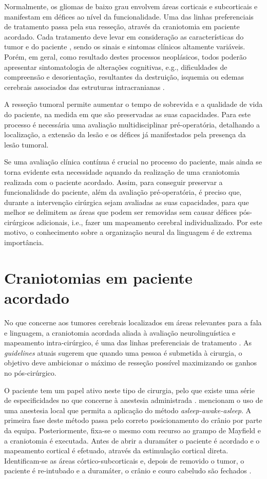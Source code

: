 \documentclass[output=paper,colorlinks,citecolor=brown,booklanguage=portuguese]{langscibook}
\begin{document}
Normalmente, os gliomas de baixo grau envolvem áreas corticais e subcorticais e manifestam em défices ao nível da funcionalidade. Uma das linhas preferenciais de tratamento passa pela sua resseção, através da craniotomia em paciente acordado. Cada tratamento deve levar em consideração as características do tumor e do paciente \citep{Bertani2009}, sendo os sinais e sintomas clínicos altamente variáveis. Porém, em geral, como resultado destes processos neoplásicos, todos poderão apresentar sintomatologia de alterações cognitivas, e.g., dificuldades de compreensão e desorientação, resultantes da destruição, isquemia ou edemas cerebrais associados das estruturas intracranianas \citep{Miotto2011}.

A resseção tumoral permite aumentar o tempo de sobrevida e a qualidade de vida do paciente, na medida em que são preservadas as suas capacidades. Para este processo é necessária uma avaliação multidisciplinar pré-operatória, detalhando a localização, a extensão da lesão e os défices já manifestados pela presença da lesão tumoral.

Se uma avaliação clínica contínua é crucial no processo do paciente, mais ainda se torna evidente esta necessidade aquando da realização de uma craniotomia realizada com o paciente acordado. Assim, para conseguir preservar a funcionalidade do paciente, além da avaliação pré-operatória, é preciso que, durante a intervenção cirúrgica sejam avaliadas as suas capacidades, para que melhor se delimitem as áreas que podem ser removidas sem causar défices pós-cirúrgicos adicionais, i.e., fazer um mapeamento cerebral individualizado. Por este motivo, o conhecimento sobre a organização neural da linguagem é de extrema importância.

\section{Craniotomias em paciente acordado}

No que concerne aos tumores cerebrais localizados em áreas relevantes para a fala e linguagem, a craniotomia acordada aliada à avaliação neurolinguística e mapeamento intra-cirúrgico, é uma das linhas preferenciais de tratamento \citep{Darder2012}. As \emph{guidelines} atuais sugerem que quando uma pessoa é submetida à cirurgia, o objetivo deve ambicionar o máximo de resseção possível maximizando os ganhos no pós-cirúrgico. 

O paciente tem um papel ativo neste tipo de cirurgia, pelo que existe uma série de especificidades no que concerne à anestesia administrada \citep{Witte2015}. \citet{Pereira2009} mencionam o uso de uma anestesia local que permita a aplicação do método \emph{asleep-awake-asleep}. A primeira fase deste método passa pelo correto posicionamento do crânio por parte da equipa. Posteriormente, fixa-se o mesmo com recurso ao grampo de Mayfield e a craniotomia é executada. Antes de abrir a duramáter o paciente é acordado e o mapeamento cortical é efetuado, através da estimulação cortical direta. Identificam-se as áreas córtico-subcorticais e, depois de removido o tumor, o paciente é re-intubado e a duramáter, o crânio e couro cabeludo são fechados \citep{Duffau2007, Duffau2014, Szelenyi2010}. 
\end{document}
